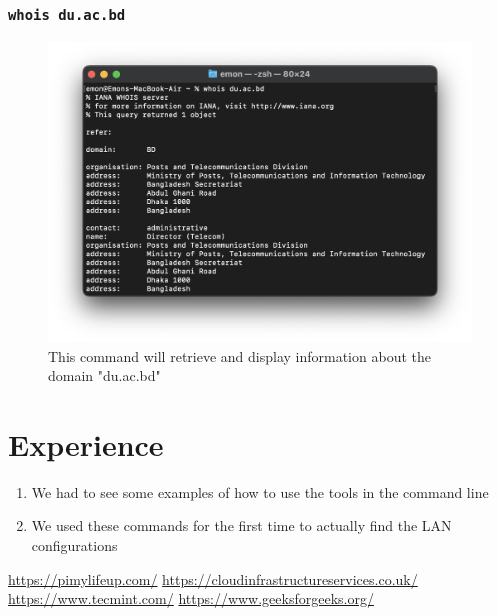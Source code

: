 \documentclass[11pt]{article}
\newcommand{\terminal}[1]{\texttt{\color{terminalcolor}#1}}
\begin{document}
\subsubsection{\terminal{whois du.ac.bd}}
\begin{figure}[!h]
    \centering
    \includegraphics[width=\textwidth]{whois.png}
    \caption{This command will retrieve and display information about the domain "du.ac.bd"}
\end{figure}

\newpage

\section{Experience}
\begin{enumerate}
    \item We had to see some examples of how to use the tools in the command line
    \item We used these commands for the first time to actually find the LAN configurations
\end{enumerate}

\begin{thebibliography}{1}
      \url{https://pimylifeup.com/}
     \url{https://cloudinfrastructureservices.co.uk/}
     \url{https://www.tecmint.com/}
     \url{https://www.geeksforgeeks.org/}
\end{thebibliography}
\end{document}
